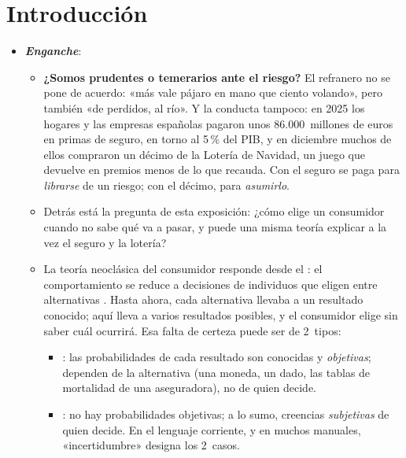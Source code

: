 \documentclass[11pt]{article}
\begin{document}
\tceetitulo

\section*{Introducción}

\begin{itemize}
\item \textbf{\emph{Enganche}}:
  \begin{itemize}
  \item \textbf{¿Somos prudentes o temerarios ante el riesgo?} El refranero no se pone de acuerdo: «más vale pájaro en mano que ciento volando», pero también «de perdidos, al río». Y la conducta tampoco: en 2025 los hogares y las empresas españolas pagaron unos 86.000~millones de euros en primas de seguro, en torno al 5\,\% del PIB\nocite{Mapfre2026Mercado,Eurostat2026Nama10gdp}, y en diciembre muchos de ellos compraron un décimo de la Lotería de Navidad, un juego que devuelve en premios menos de lo que recauda. Con el seguro se paga para \emph{librarse} de un riesgo; con el décimo, para \emph{asumirlo}.
  \item Detrás está la pregunta de esta exposición: ¿cómo elige un consumidor cuando no sabe qué va a pasar, y puede una misma teoría explicar a la vez el seguro y la lotería?
  \item La teoría neoclásica del consumidor responde desde el : el comportamiento se reduce a decisiones de individuos que eligen entre alternativas . Hasta ahora, cada alternativa llevaba a un resultado conocido; aquí lleva a varios resultados posibles, y el consumidor elige sin saber cuál ocurrirá. Esa falta de certeza puede ser de 2~tipos:
    \begin{itemize}
    \item {}: las probabilidades de cada resultado son conocidas y \emph{objetivas}; dependen de la alternativa (una moneda, un dado, las tablas de mortalidad de una aseguradora), no de quien decide.
    \item {}: no hay probabilidades objetivas; a lo sumo, creencias \emph{subjetivas} de quien decide. En el lenguaje corriente, y en muchos manuales, «incertidumbre» designa los 2~casos.
    \end{itemize}
  \end{itemize}


\end{itemize}
\end{document}
